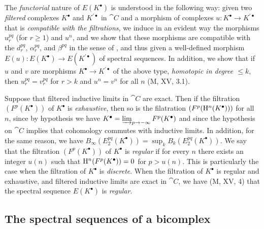 
\begin{env}[11.2.3]
\label{0.11.2.3}
The \emph{functorial} nature of $E(K^\bullet)$ is understood in the following way: given two \emph{filtered} complexes $K^\bullet$ and $K^{\prime\bullet}$ in $\cat{C}$ and a morphism of complexes $u:K^\bullet\to K^{\prime\bullet}$ that is \emph{compatible with the filtrations}, we induce in an evident way the morphisms $u_r^{pq}$ (for $r\geq 1$) and $u^n$, and we show that these morphisms are compatible with the $d_r^{pq}$, $\alpha_r^{pq}$, and $\beta^{pq}$ in the sense of , and thus given a well-defined morphism $E(u):E(K^\bullet)\to E(K^{\prime\bullet})$ of spectral sequences.
In addition, we show that if $u$ and $v$ are morphisms $K^\bullet\to K^{\prime\bullet}$ of the above type, \emph{homotopic in degree $\leq k$}, then $u_r^{pq}=v_r^{pq}$ for $r>k$ and $u^n=v^n$ for all $n$ (M, XV, 3.1).
\end{env}

\begin{env}[11.2.4]
\label{0.11.2.4}
Suppose that filtered inductive limits in $\cat{C}$ are exact.
Then if the filtration $(F^p(K^\bullet))$ of $K^\bullet$ is \emph{exhaustive}, then so is the filatration $(F^p(\mathrm{H}^n(K^\bullet)))$ for all $n$, since by hypothesis we have $K^\bullet=\varinjlim_{p\to-\infty}F^p(K^\bullet)$ and since the hypothesis on $\cat{C}$ implies that cohomology commutes with inductive limits.
In addition, for the same reason, we have $B_\infty(E_2^{pq}(K^\bullet))=\sup_k B_k(E_2^{pq}(K^\bullet))$.
We say that the filtration $(F^p(K^\bullet))$ of $K^\bullet$ is \emph{regular} if for every $n$ there exists an integer $u(n)$ such that $\mathrm{H}^n(F^p(K^\bullet))=0$ for $p>u(n)$.
This is particularly the case when the filtration of $K^\bullet$ is \emph{discrete}.
When the filtration of $K^\bullet$ is regular and exhaustive, and filtered inductive limits are exact in $\cat{C}$, we have (M, XV, 4) that the spectral sequence $E(K^\bullet)$ is \emph{regular}.
\end{env}

\subsection{The spectral sequences of a bicomplex}
\label{subsection:0.11.3}

